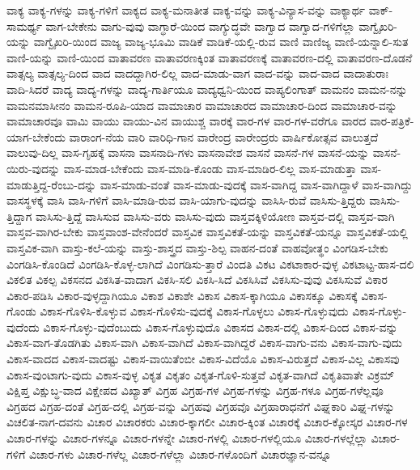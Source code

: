 {ವಾಕ್ಯ
ವಾಕ್ಯ-ಗಳನ್ನು
ವಾಕ್ಯ-ಗಳಿಗೆ
ವಾಕ್ಯದ
ವಾಕ್ಯ-ಮನಾತೀತ
ವಾಕ್ಯ-ವನ್ನು
ವಾಕ್ಯ-ವಿನ್ಯಾಸ-ವನ್ನು
ವಾಕ್ಯಾರ್ಥ
ವಾಕ್-ಸಾಮರ್ಥ್ಯ
ವಾಗ-ಬೇಕೇನು
ವಾಗು-ವುವು
ವಾಗ್ಧಾರೆ-ಯಿಂದ
ವಾಗ್ಯುದ್ಧವೇ
ವಾಗ್ವಾದ
ವಾಗ್ವಾದ-ಗಳಿಗೆಲ್ಲಾ
ವಾಗ್ವೈಖರಿ-ಯನ್ನು
ವಾಗ್ವೈಖರಿ-ಯಿಂದ
ವಾಜ್ಯ
ವಾಜ್ಯ-ಭೂಮಿ
ವಾಡಿಕೆ
ವಾಡಿಕೆ-ಯಲ್ಲಿ-ರುವ
ವಾಣಿ
ವಾಣಿಜ್ಯ
ವಾಣಿ-ಯನ್ನಾಲಿ-ಸುತ
ವಾಣಿ-ಯನ್ನು
ವಾಣಿ-ಯಿಂದ
ವಾತಾವರಣ
ವಾತಾವರಣಕ್ಕಿಂತ
ವಾತಾವರಣಕ್ಕೆ
ವಾತಾವರಣ-ದಲ್ಲಿ
ವಾತಾವರಣ-ದೊಡನೆ
ವಾತ್ಸಲ್ಯ
ವಾತ್ಸಲ್ಯ-ದಿಂದ
ವಾದ
ವಾದದ್ದಾಗಿರ-ಲಿಲ್ಲ
ವಾದ-ಮಾಡು-ವಾಗ
ವಾದ-ವನ್ನು
ವಾದ-ವಾದ
ವಾದಾತುರಾಃ
ವಾದಿ-ಸಿದರೆ
ವಾದ್ಯ
ವಾದ್ಯ-ಗಳನ್ನು
ವಾದ್ಯ-ಗಾರ್ತಿಯೂ
ವಾದ್ಯಧ್ವನಿ-ಯಿಂದ
ವಾಪ್ಯಲಿಂಗಾತ್
ವಾಮನಂ
ವಾಮನ-ನನ್ನು
ವಾಮನಮಾಸೀನಂ
ವಾಮನ-ರೂಪಿ-ಯಾದ
ವಾಮಾಚಾರ
ವಾಮಾಚಾರದ
ವಾಮಾಚಾರ-ದಿಂದ
ವಾಮಾಚಾರ-ವನ್ನು
ವಾಮಾಚಾರವೂ
ವಾಮಿ
ವಾಯು
ವಾಯು-ವಿನ
ವಾಯುಶ್ಚ
ವಾರಕ್ಕೆ
ವಾರ-ಗಳ
ವಾರ-ಗಳ-ವರೆಗೂ
ವಾರದ
ವಾರ-ಪತ್ರಿಕೆ-ಯಾಗ-ಬೇಕೆಂದು
ವಾರಾಂಗ-ನೆಯ
ವಾರಿ
ವಾರಿಧಿ-ಗಾನ
ವಾರೇಂದ್ರ
ವಾರೇಂದ್ರರು
ವಾರ್ಷಿಕೋತ್ಸವ
ವಾಲುತ್ತದೆ
ವಾಲುವು-ದಿಲ್ಲ
ವಾಸ-ಗೃಹಕ್ಕೆ
ವಾಸನಾ
ವಾಸನಾದಿ-ಗಳು
ವಾಸನಾವೇಶ
ವಾಸನೆ
ವಾಸನೆ-ಗಳ
ವಾಸನೆ-ಯನ್ನು
ವಾಸನೆ-ಯಿರು-ವುದನ್ನು
ವಾಸ-ಮಾಡ-ಬೇಕೆಂದು
ವಾಸ-ಮಾಡಿ-ಕೊಂಡು
ವಾಸ-ಮಾಡಿರ-ಲಿಲ್ಲ
ವಾಸ-ಮಾಡುತ್ತಾ
ವಾಸ-ಮಾಡುತ್ತಿದ್ದ-ರೆಂಬು-ದನ್ನು
ವಾಸ-ಮಾಡು-ವಂತೆ
ವಾಸ-ಮಾಡು-ವುದಕ್ಕೆ
ವಾಸ-ವಾಗಿದ್ದ
ವಾಸ-ವಾಗಿದ್ದಾಳೆ
ವಾಸ-ವಾಗಿದ್ದು
ವಾಸಸ್ಥಳಕ್ಕೆ
ವಾಸಿ
ವಾಸಿ-ಗಳಿಗೆ
ವಾಸಿ-ಮಾಡಿ-ರುವ
ವಾಸಿ-ಯಾಗು-ವುದನ್ನು
ವಾಸಿಸಿ-ರುವೆ
ವಾಸಿಸು-ತ್ತಿದ್ದರು
ವಾಸಿಸು-ತ್ತಿದ್ದಾಗ
ವಾಸಿಸು-ತ್ತಿದ್ದೆ
ವಾಸಿಸುವ
ವಾಸಿಸು-ವರು
ವಾಸಿಸು-ವುದು
ವಾಸ್ತವಕ್ಕಿಳಿಯೋಣ
ವಾಸ್ತವ-ದಲ್ಲಿ
ವಾಸ್ತವ-ವಾಗಿ
ವಾಸ್ತವ-ವಾಗಿರ-ಬೇಕು
ವಾಸ್ತವಾಂಶ-ವೇನೆಂದರೆ
ವಾಸ್ತವಿಕ
ವಾಸ್ತವಿಕತೆ-ಯನ್ನು
ವಾಸ್ತವಿಕತೆ-ಯನ್ನೂ
ವಾಸ್ತವಿಕತೆ-ಯಲ್ಲಿ
ವಾಸ್ತವಿಕ-ವಾಗಿ
ವಾಸ್ತು-ಕಲೆ-ಯನ್ನು
ವಾಸ್ತು-ಶಾಸ್ತ್ರದ
ವಾಸ್ತು-ಶಿಲ್ಪ
ವಾಹನ-ದಂತೆ
ವಾಹವೋತ್ಥಂ
ವಿಂಗಡಿಸ-ಬೇಕು
ವಿಂಗಡಿಸಿ-ಕೊಂಡಿದೆ
ವಿಂಗಡಿಸಿ-ಕೊಳ್ಳ-ಲಾಗಿದೆ
ವಿಂಗಡಿಸು-ತ್ತಾರೆ
ವಿಂದತಿ
ವಿಕಟ
ವಿಕಟಾಕಾರ-ವುಳ್ಳ
ವಿಕಟಾಟ್ಟ-ಹಾಸ-ದಲಿ
ವಿಕಲಿತ
ವಿಕಲ್ಪ
ವಿಕಸನದ
ವಿಕಸಿತ-ವಾದಾಗ
ವಿಕಸಿ-ಸಲಿ
ವಿಕಸಿ-ಸಿದೆ
ವಿಕಸಿಸಿವೆ
ವಿಕಸಿಸು-ವುವು
ವಿಕಸಿಸುವೆ
ವಿಕಾರ
ವಿಕಾರ-ಪಡಿಸಿ
ವಿಕಾರ-ವುಳ್ಳದ್ದಾಗಿಯೂ
ವಿಕಾಶ
ವಿಕಾಶೇ
ವಿಕಾಸ
ವಿಕಾಸ-ಕ್ಕಾಗಿಯೂ
ವಿಕಾಸಕ್ಕೂ
ವಿಕಾಸಕ್ಕೆ
ವಿಕಾಸ-ಗೊಂಡು
ವಿಕಾಸ-ಗೊಳಿಸಿ-ಕೊಳ್ಳುವ
ವಿಕಾಸ-ಗೊಳಿಸು-ವುದಕ್ಕೆ
ವಿಕಾಸ-ಗೊಳ್ಳಲು
ವಿಕಾಸ-ಗೊಳ್ಳುವುದು
ವಿಕಾಸ-ಗೊಳ್ಳು-ವುದೆಂದು
ವಿಕಾಸ-ಗೊಳ್ಳು-ವುದೆಂಬುದು
ವಿಕಾಸ-ಗೊಳ್ಳುವುದೊ
ವಿಕಾಸದ
ವಿಕಾಸ-ದಲ್ಲಿ
ವಿಕಾಸ-ದಿಂದ
ವಿಕಾಸ-ವನ್ನು
ವಿಕಾಸ-ವಾಗ-ತೊಡಗಿತು
ವಿಕಾಸ-ವಾಗಿ
ವಿಕಾಸ-ವಾಗಿದೆ
ವಿಕಾಸ-ವಾಗಿದ್ದರೆ
ವಿಕಾಸ-ವಾಗು-ವನು
ವಿಕಾಸ-ವಾಗು-ವುದು
ವಿಕಾಸ-ವಾದದ
ವಿಕಾಸ-ವಾದಷ್ಟು
ವಿಕಾಸ-ವಾಯಿತೆಂಬೀ
ವಿಕಾಸ-ವಿದೆಯೊ
ವಿಕಾಸ-ವಿರುತ್ತದೆ
ವಿಕಾಸ-ವಿಲ್ಲ
ವಿಕಾಸವು
ವಿಕಾಸ-ವುಂಟಾಗು-ವುದು
ವಿಕಾಸ-ವುಳ್ಳ
ವಿಕೃತ
ವಿಕೃತಂ
ವಿಕೃತ-ಗೊಳಿ-ಸುತ್ತವೆ
ವಿಕೃತ-ವಾಗಿದೆ
ವಿಕೃತಿವಾತೇ
ವಿಕ್ರಮ್
ವಿಕ್ಷಿಪ್ತ
ವಿಕ್ಷುಬ್ಧ-ವಾದ
ವಿಕ್ಷೇಪದ
ವಿಖ್ಯಾತ್
ವಿಗ್ರಹ
ವಿಗ್ರಹ-ಗಳ
ವಿಗ್ರಹ-ಗಳನ್ನು
ವಿಗ್ರಹ-ಗಳೂ
ವಿಗ್ರಹ-ಗಳೆಲ್ಲವೂ
ವಿಗ್ರಹದ
ವಿಗ್ರಹ-ದಂತೆ
ವಿಗ್ರಹ-ದಲ್ಲಿ
ವಿಗ್ರಹ-ವನ್ನು
ವಿಗ್ರಹವು
ವಿಗ್ರಹವೊ
ವಿಗ್ರಹಾರಾಧನೆಗೆ
ವಿಘ್ನಕಾರಿ
ವಿಘ್ನ-ಗಳನ್ನು
ವಿಚಲಿತ-ನಾಗ-ದವನು
ವಿಚಾರ
ವಿಚಾರಕರು
ವಿಚಾರ-ಕ್ಕಾಗಲೀ
ವಿಚಾರ-ಕ್ಕಿಂತ
ವಿಚಾರಕ್ಕೆ
ವಿಚಾರ-ಕ್ಕೋಸ್ಕರ
ವಿಚಾರ-ಗಳ
ವಿಚಾರ-ಗಳನ್ನು
ವಿಚಾರ-ಗಳನ್ನೂ
ವಿಚಾರ-ಗಳನ್ನೇ
ವಿಚಾರ-ಗಳಲ್ಲಿ
ವಿಚಾರ-ಗಳಲ್ಲಿಯೂ
ವಿಚಾರ-ಗಳಲ್ಲೆಲ್ಲಾ
ವಿಚಾರ-ಗಳಿಗೆ
ವಿಚಾರ-ಗಳು
ವಿಚಾರ-ಗಳೆಲ್ಲ
ವಿಚಾರ-ಗಳೆಲ್ಲಾ
ವಿಚಾರ-ಗಳೊಂದಿಗೆ
ವಿಚಾರಜ್ಞಾನ-ವನ್ನೂ
}
